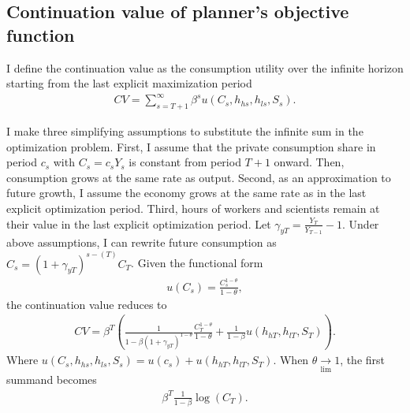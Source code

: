 \subsection{Continuation value of planner's objective function}\label{app:PV}


I define the continuation value as the consumption utility over the infinite horizon starting from the last explicit maximization period
\begin{align*}
CV=\sum_{s=T+1}^{\infty} \beta^{s}u(C_s, h_{hs}, h_{ls}, S_{s}).
\end{align*}


I make three simplifying assumptions to substitute the infinite sum in the optimization problem. First, 
I assume that the private consumption share in period $c_s$ with $C_s=c_sY_s$ is constant from period $T+1$ onward.  Then, consumption grows at the same rate as output. 
Second, as an approximation to future growth, I assume the economy grows at the same rate as in the last explicit optimization period. Third, hours of workers and scientists remain at their value in the last explicit optimization period. %
Let $\gamma_{yT}=\frac{Y_{T}}{Y_{T-1}}-1$. Under above assumptions, I can rewrite future consumption as $C_s=(1+\gamma_{yT})^{s-(T)}C_{T}$.
Given the functional form
\begin{align*}
u(C_s)= \frac{C_s^{1-\theta}}{1-\theta},
\end{align*}
the continuation value reduces to
\begin{align*}
CV= \beta^{T}\left(\frac{1}{1-\beta (1+\gamma_{yT})^{1-\theta}}\frac{C_{T}^{1-\theta}}{1-\theta}+ \frac{1}{1-\beta}u(h_{hT}, h_{lT}, S_T)\right).
\end{align*}
Where $u(C_s, h_{hs}, h_{ls}, S_{s})=u(c_s)+u(h_{hT}, h_{lT}, S_T)$.
When $\theta\underset{\lim}{\rightarrow} 1$,  the first summand becomes
\begin{align*}
\beta^{T}\frac{1}{1-\beta}\log(C_{T}).
\end{align*}

